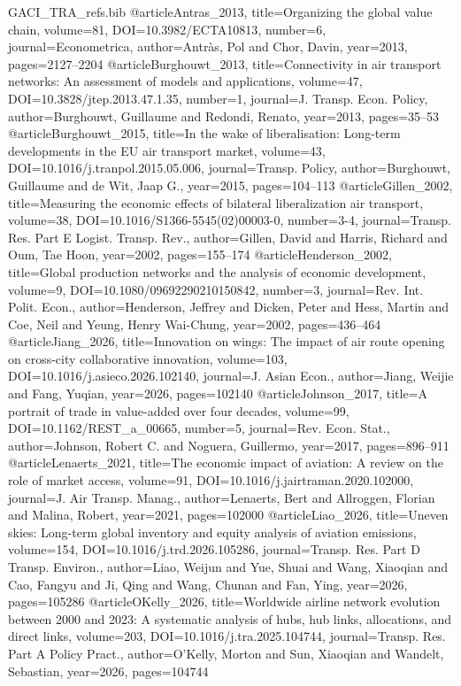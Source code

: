 \begin{filecontents*}[overwrite]{GACI_TRA_refs.bib}
@article{Antras_2013, title={Organizing the global value chain}, volume={81}, DOI={10.3982/ECTA10813}, number={6}, journal={Econometrica}, author={Antr\`as, Pol and Chor, Davin}, year={2013}, pages={2127--2204} }
@article{Burghouwt_2013, title={Connectivity in air transport networks: An assessment of models and applications}, volume={47}, DOI={10.3828/jtep.2013.47.1.35}, number={1}, journal={J. Transp. Econ. Policy}, author={Burghouwt, Guillaume and Redondi, Renato}, year={2013}, pages={35--53} }
@article{Burghouwt_2015, title={In the wake of liberalisation: Long-term developments in the {EU} air transport market}, volume={43}, DOI={10.1016/j.tranpol.2015.05.006}, journal={Transp. Policy}, author={Burghouwt, Guillaume and de Wit, Jaap G.}, year={2015}, pages={104--113} }
@article{Gillen_2002, title={Measuring the economic effects of bilateral liberalization air transport}, volume={38}, DOI={10.1016/S1366-5545(02)00003-0}, number={3-4}, journal={Transp. Res. Part E Logist. Transp. Rev.}, author={Gillen, David and Harris, Richard and Oum, Tae Hoon}, year={2002}, pages={155--174} }
@article{Henderson_2002, title={Global production networks and the analysis of economic development}, volume={9}, DOI={10.1080/09692290210150842}, number={3}, journal={Rev. Int. Polit. Econ.}, author={Henderson, Jeffrey and Dicken, Peter and Hess, Martin and Coe, Neil and Yeung, Henry Wai-Chung}, year={2002}, pages={436--464} }
@article{Jiang_2026, title={Innovation on wings: The impact of air route opening on cross-city collaborative innovation}, volume={103}, DOI={10.1016/j.asieco.2026.102140}, journal={J. Asian Econ.}, author={Jiang, Weijie and Fang, Yuqian}, year={2026}, pages={102140} }
@article{Johnson_2017, title={A portrait of trade in value-added over four decades}, volume={99}, DOI={10.1162/REST_a_00665}, number={5}, journal={Rev. Econ. Stat.}, author={Johnson, Robert C. and Noguera, Guillermo}, year={2017}, pages={896--911} }
@article{Lenaerts_2021, title={The economic impact of aviation: A review on the role of market access}, volume={91}, DOI={10.1016/j.jairtraman.2020.102000}, journal={J. Air Transp. Manag.}, author={Lenaerts, Bert and Allroggen, Florian and Malina, Robert}, year={2021}, pages={102000} }
@article{Liao_2026, title={Uneven skies: Long-term global inventory and equity analysis of aviation emissions}, volume={154}, DOI={10.1016/j.trd.2026.105286}, journal={Transp. Res. Part D Transp. Environ.}, author={Liao, Weijun and Yue, Shuai and Wang, Xiaoqian and Cao, Fangyu and Ji, Qing and Wang, Chunan and Fan, Ying}, year={2026}, pages={105286} }
@article{OKelly_2026, title={Worldwide airline network evolution between 2000 and 2023: A systematic analysis of hubs, hub links, allocations, and direct links}, volume={203}, DOI={10.1016/j.tra.2025.104744}, journal={Transp. Res. Part A Policy Pract.}, author={O'Kelly, Morton and Sun, Xiaoqian and Wandelt, Sebastian}, year={2026}, pages={104744} }

\end{filecontents*}
